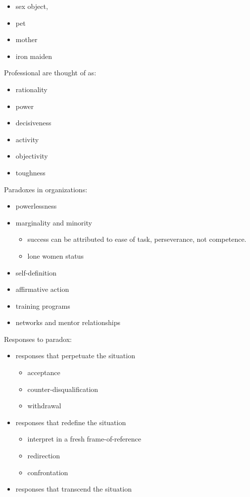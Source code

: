 \documentclass[
]{book}
\begin{document}
\begin{itemize}
\item
  sex object,
\item
  pet
\item
  mother
\item
  iron maiden
\end{itemize}

Professional are thought of as:

\begin{itemize}
\item
  rationality
\item
  power
\item
  decisiveness
\item
  activity
\item
  objectivity
\item
  toughness
\end{itemize}

Paradoxes in organizations:

\begin{itemize}
\item
  powerlessness
\item
  marginality and minority

  \begin{itemize}
  \item
    success can be attributed to ease of task, perseverance, not competence.
  \item
    lone women status
  \end{itemize}
\item
  self-definition
\item
  affirmative action
\item
  training programs
\item
  networks and mentor relationships
\end{itemize}

Responses to paradox:

\begin{itemize}
\item
  responses that perpetuate the situation

  \begin{itemize}
  \item
    acceptance
  \item
    counter-disqualification
  \item
    withdrawal
  \end{itemize}
\item
  responses that redefine the situation

  \begin{itemize}
  \item
    interpret in a fresh frame-of-reference
  \item
    redirection
  \item
    confrontation
  \end{itemize}
\item
  responses that transcend the situation
\end{itemize}
\end{document}
